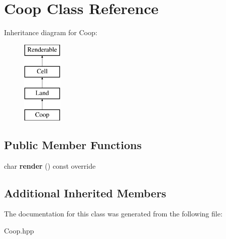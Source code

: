 \hypertarget{class_coop}{}\section{Coop Class Reference}
\label{class_coop}
Inheritance diagram for Coop\+:\begin{figure}[H]
\begin{center}
\leavevmode
\includegraphics[height=4.000000cm]{class_coop}
\end{center}
\end{figure}
\subsection*{Public Member Functions}
\begin{DoxyCompactItemize}
\item 
\mbox{\label{class_coop_af1fc2ddad6749ddae14c13a403fca1d6}} 
char {\bfseries render} () const override
\end{DoxyCompactItemize}
\subsection*{Additional Inherited Members}


The documentation for this class was generated from the following file\+:\begin{DoxyCompactItemize}
\item 
Coop.\+hpp\end{DoxyCompactItemize}
